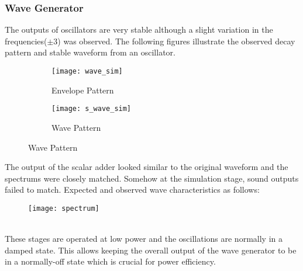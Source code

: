 \subsubsection*{Wave Generator}
The outputs of oscillators are very stable although a slight variation in the frequencies($\pm 3$) was observed. The following figures illustrate the observed decay pattern and stable waveform from an oscillator.
\begin{figure}[h]
    \begin{subfigure}{.48\columnwidth}
        \texttt{[image: wave\_sim]}
        \caption*{Envelope Pattern}
    \end{subfigure}
    \begin{subfigure}{.48\columnwidth}
        \texttt{[image: s\_wave\_sim]}
        \caption*{Wave Pattern}
    \end{subfigure}
\end{figure}

The output of the scalar adder looked similar to the original waveform and the spectrums were closely matched. Somehow at the simulation stage, sound outputs failed to match. Expected and observed wave characteristics as follows:
\begin{figure}[h]
    \texttt{[image: spectrum]}
\end{figure}
\\
These stages are operated at low power and the oscillations are normally in a damped state. This allows keeping the overall output of the wave generator to be in a normally-off state which is crucial for power efficiency.

